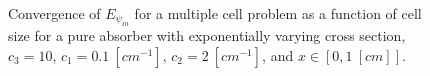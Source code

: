 \begin{figure}[!htp]
\begin{center}
{}
\end{center}
\caption{Convergence of $E_{\psi_{in}}$ for a multiple cell problem as a function of cell size for a pure absorber with exponentially varying cross section, $c_3=10$, $c_1 = 0.1~[cm^{-1}]$, $c_2 = 2~[cm^{-1}]$, and $x\in \left[0,1~[cm] \right]$.}
\label{fig:varxs_psi_in}
\end{figure}
%
%
%
